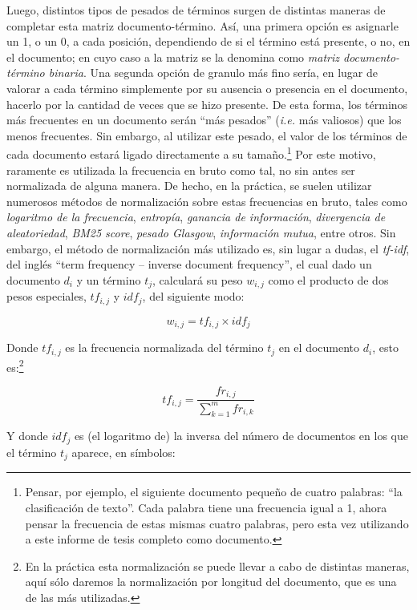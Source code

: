 Luego, distintos tipos de pesados de términos surgen de distintas maneras de completar esta matriz documento-término.
Así, una primera opción es asignarle un 1, o un 0, a cada posición, dependiendo de si el término está presente, o no, en el documento; en cuyo caso a la matriz se la denomina como \emph{matriz documento-término binaria}.
Una segunda opción de granulo más fino sería, en lugar de valorar a cada término simplemente por su ausencia o presencia en el documento, hacerlo por la cantidad de veces que se hizo presente. De esta forma, los términos más frecuentes en un documento serán ``más pesados'' (\emph{i.e.} más valiosos) que los menos frecuentes.
Sin embargo, al utilizar este pesado, el valor de los términos de cada documento estará ligado directamente a su tamaño.\footnote{Pensar, por ejemplo, el siguiente documento pequeño de cuatro palabras: ``la clasificación de texto''. Cada palabra tiene una frecuencia igual a 1, ahora pensar la frecuencia de estas mismas cuatro palabras, pero esta vez utilizando a este informe de tesis completo como documento.}
Por este motivo, raramente es utilizada la frecuencia en bruto como tal, no sin antes ser normalizada de alguna manera.
De hecho, en la práctica, se suelen utilizar numerosos métodos de normalización sobre estas frecuencias en bruto, tales como \emph{logaritmo de la frecuencia}, \emph{entropía}, \emph{ganancia de información}, \emph{divergencia de aleatoriedad}, \emph{BM25 score}, \emph{pesado Glasgow}, \emph{información mutua}, entre otros\cite{miner2012practical}.
Sin embargo, el método de normalización más utilizado es, sin lugar a dudas, el  \emph{tf-idf}, del inglés ``term frequency – inverse document frequency''\cite{salton1988term}, el cual dado un documento $d_i$ y un término $t_j$, calculará su peso $w_{i,j}$ como el producto de dos pesos especiales, $tf_{i,j}$ y $idf_{j}$, del siguiente modo:

\begin{equation}
w_{i,j}=tf_{i,j}\times idf_{j}
\label{eq:tf-idf}
\end{equation}

Donde $tf_{i,j}$ es la frecuencia normalizada del término $t_j$ en el documento $d_i$, esto es:\footnote{En la práctica esta normalización se puede llevar a cabo de distintas maneras, aquí sólo daremos la normalización por longitud del documento, que es una de las más utilizadas.}

$$tf_{i,j}= \frac{fr_{i,j}}{\sum^m_{k=1}fr_{i,k}}$$

Y donde $idf_{j}$ es (el logaritmo de) la inversa del número de documentos en los que el término $t_j$ aparece, en símbolos:

